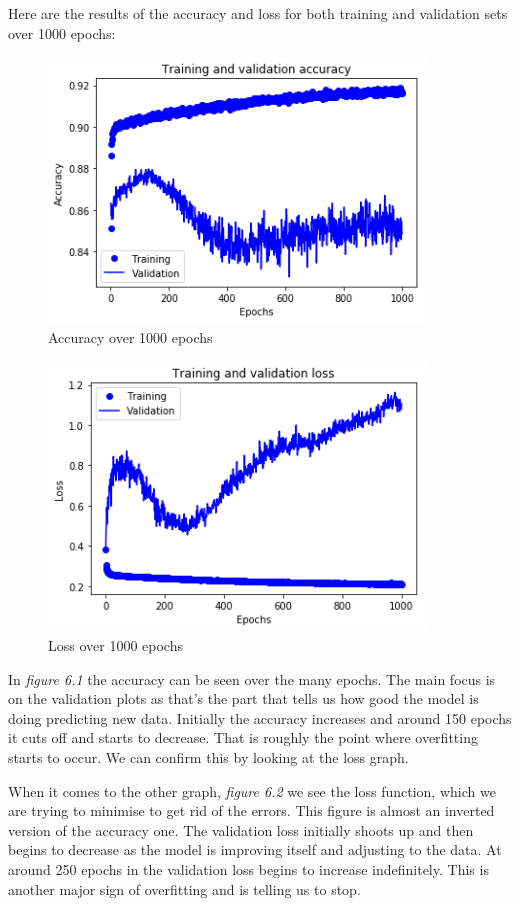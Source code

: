 Here are the results of the accuracy and loss for both training and validation sets over 1000 epochs:
\begin{figure}[!h]
    \centering
	\includegraphics[width=100mm]{figures/accgraph}
	\caption{Accuracy over 1000 epochs}
\end{figure}
\begin{figure}[!h]
    \centering
	\includegraphics[width=100mm]{figures/lossgraph}
	\caption{Loss over 1000 epochs}
\end{figure}

In \textit{figure 6.1} the accuracy can be seen over the many epochs. The main focus is on the validation plots as that's the part that tells us how good the model is doing predicting new data. Initially the accuracy increases and around 150 epochs it cuts off and starts to decrease. That is roughly the point where overfitting starts to occur. We can confirm this by looking at the loss graph.

When it comes to the other graph, \textit{figure 6.2} we see the loss function, which we are trying to minimise to get rid of the errors. This figure is almost an inverted version of the accuracy one. The validation loss initially shoots up and then begins to decrease as the model is improving itself and adjusting to the data. At around 250 epochs in the validation loss begins to increase indefinitely. This is another major sign of overfitting and is telling us to stop. 

